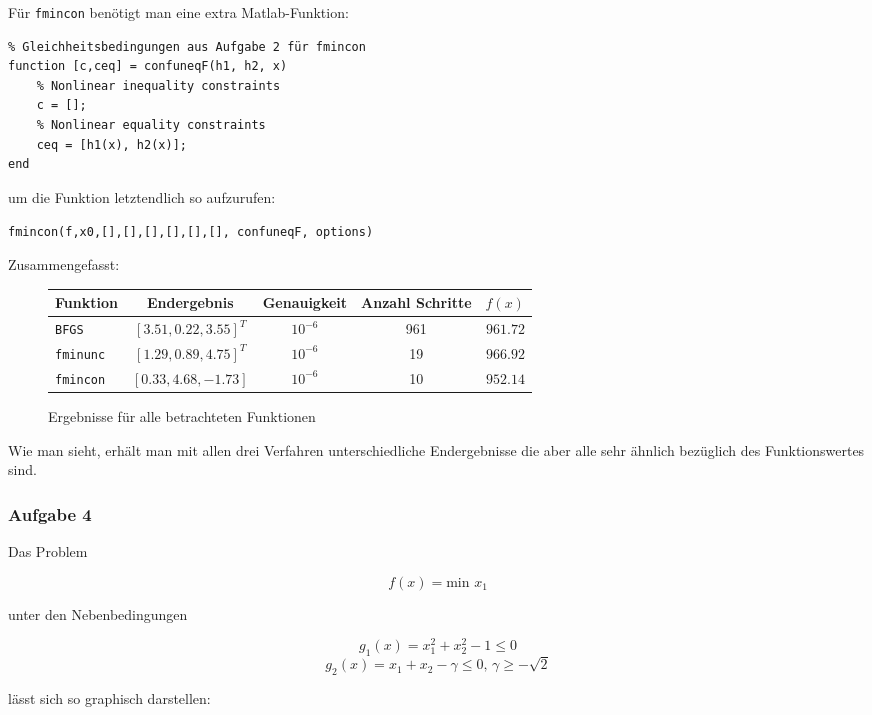 \documentclass[a4paper, 12pt]{report}
\begin{document}
Für \lstinline[basicstyle=\ttfamily\color{black}]|fmincon| benötigt man eine extra Matlab-Funktion:

\begin{lstlisting}
% Gleichheitsbedingungen aus Aufgabe 2 für fmincon
function [c,ceq] = confuneqF(h1, h2, x)
    % Nonlinear inequality constraints
    c = [];
    % Nonlinear equality constraints
    ceq = [h1(x), h2(x)];
end\end{lstlisting}

um die Funktion letztendlich so aufzurufen:\par
\lstinline|fmincon(f,x0,[],[],[],[],[],[], confuneqF, options)|

Zusammengefasst:

\begin{figure}[H]
  \centering
  \def\arraystretch{1.25}
  \begin{tabular}{l|c|c|c|r}
    \hline
    \textbf{Funktion} & \textbf{Endergebnis} & \textbf{Genauigkeit} & \textbf{Anzahl Schritte} & \textbf{$f(x)$}\\
    \hline
    \lstinline|BFGS| & $[3.51, 0.22, 3.55]^T$ & $10^{-6}$ & 961 & $961.72$\\
    \lstinline|fminunc| & $[1.29, 0.89, 4.75]^T$ & $10^{-6}$ & 19 & $966.92$ \\
    \lstinline|fmincon| & $[0.33, 4.68, -1.73]$ & $10^{-6}$ & 10 &$952.14$\\
    \hline
  \end{tabular}
  \caption{Ergebnisse für alle betrachteten Funktionen}
\end{figure}

Wie man sieht, erhält man mit allen drei Verfahren unterschiedliche Endergebnisse die aber alle sehr ähnlich bezüglich des
Funktionswertes sind.

\subsubsection{Aufgabe 4}

Das Problem

$$f(x) = \text{min } x_1$$

unter den Nebenbedingungen

$$g_1(x) = x_1^2 + x_2^2 - 1 \leq 0$$
$$g_2(x) = x_1 + x_2 - \gamma \leq 0 \text{, } \gamma \geq -\sqrt{2}$$

lässt sich so graphisch darstellen:
\end{document}

